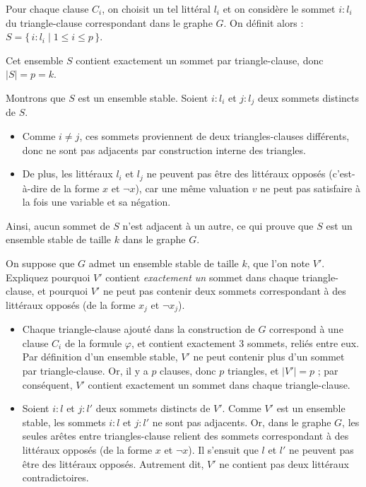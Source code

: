\begin{exercice}
\begin{corrections}
    Pour chaque clause $C_i$, on choisit un tel littéral $l_i$ et on considère le sommet $i : l_i$ du triangle-clause correspondant dans le graphe $G$. On définit alors :
    $S = \{\, i : l_i \mid 1 \leq i \leq p \,\}$.

    Cet ensemble $S$ contient exactement un sommet par triangle-clause, donc $|S| = p = k$.

    Montrons que $S$ est un ensemble stable. Soient $i : l_i$ et $j : l_j$ deux sommets distincts de $S$.
    \begin{itemize}
    \item Comme $i \neq j$, ces sommets proviennent de deux triangles-clauses différents, donc ne sont pas adjacents par construction interne des triangles.
    \item De plus, les littéraux $l_i$ et $l_j$ ne peuvent pas être des littéraux opposés (c'est-à-dire de la forme $x$ et $\lnot x$), car une même valuation $v$ ne peut pas satisfaire à la fois une variable et sa négation.
    \end{itemize}

    Ainsi, aucun sommet de $S$ n’est adjacent à un autre, ce qui prouve que $S$ est un ensemble stable de taille $k$ dans le graphe $G$.
  \end{corrections}

  \begin{questions}
  \item\label{ex3.Q5} On suppose que $G$ admet un ensemble stable de taille $k$, que l'on note $V'$.
    Expliquez pourquoi $V'$ contient {\em exactement un} sommet dans chaque triangle-clause, et
    pourquoi $V'$ ne peut pas contenir deux sommets correspondant à des littéraux opposés (de la forme $x_j$ et $\neg x_j$).
  \end{questions}
  \begin{corrections}
    \begin{itemize}
    \item Chaque triangle-clause ajouté dans la construction de $G$ correspond à une clause $C_i$ de la formule $\varphi$, et contient exactement 3 sommets, reliés entre eux. Par définition d’un ensemble stable, $V'$ ne peut contenir plus d’un sommet par triangle-clause. Or, il y a $p$ clauses, donc $p$ triangles, et $|V'| = p$ ; par conséquent, $V'$ contient exactement un sommet dans chaque triangle-clause.

    \item Soient $i : l$ et $j : l'$ deux sommets distincts de $V'$. Comme $V'$ est un ensemble stable, les sommets $i : l$ et $j : l'$ ne sont pas adjacents. Or, dans le graphe $G$, les seules arêtes entre triangles-clause relient des sommets correspondant à des littéraux opposés (de la forme $x$ et $\lnot x$). Il s’ensuit que $l$ et $l'$ ne peuvent pas être des littéraux opposés. Autrement dit, $V'$ ne contient pas deux littéraux contradictoires.
    \end{itemize}
  \end{corrections}


\end{exercice}
